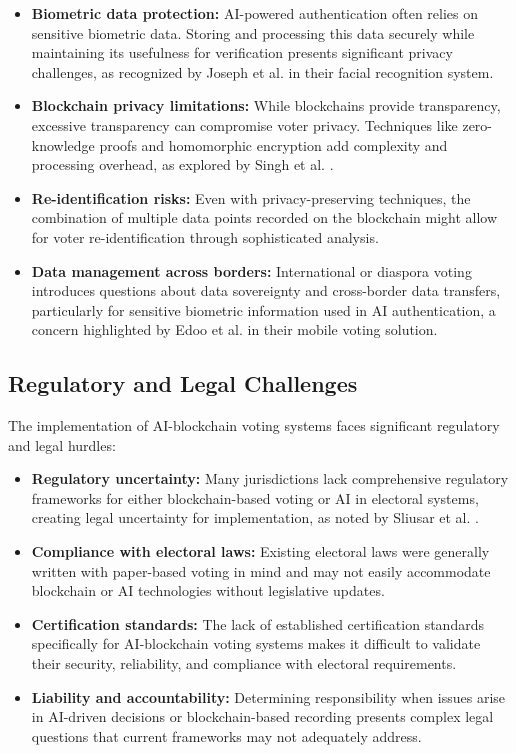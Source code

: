 \documentclass[conference]{IEEEtran}
\begin{document}
\begin{itemize}
    \item \textbf{Biometric data protection:} AI-powered authentication often relies on sensitive biometric data. Storing and processing this data securely while maintaining its usefulness for verification presents significant privacy challenges, as recognized by Joseph et al. \cite{b8} in their facial recognition system.
    
    \item \textbf{Blockchain privacy limitations:} While blockchains provide transparency, excessive transparency can compromise voter privacy. Techniques like zero-knowledge proofs and homomorphic encryption add complexity and processing overhead, as explored by Singh et al. \cite{b7}.
    
    \item \textbf{Re-identification risks:} Even with privacy-preserving techniques, the combination of multiple data points recorded on the blockchain might allow for voter re-identification through sophisticated analysis.
    
    \item \textbf{Data management across borders:} International or diaspora voting introduces questions about data sovereignty and cross-border data transfers, particularly for sensitive biometric information used in AI authentication, a concern highlighted by Edoo et al. \cite{b9} in their mobile voting solution.
\end{itemize}

\subsection{Regulatory and Legal Challenges}
The implementation of AI-blockchain voting systems faces significant regulatory and legal hurdles:

\begin{itemize}
    \item \textbf{Regulatory uncertainty:} Many jurisdictions lack comprehensive regulatory frameworks for either blockchain-based voting or AI in electoral systems, creating legal uncertainty for implementation, as noted by Sliusar et al. \cite{b6}.
    
    \item \textbf{Compliance with electoral laws:} Existing electoral laws were generally written with paper-based voting in mind and may not easily accommodate blockchain or AI technologies without legislative updates.
    
    \item \textbf{Certification standards:} The lack of established certification standards specifically for AI-blockchain voting systems makes it difficult to validate their security, reliability, and compliance with electoral requirements.
    
    \item \textbf{Liability and accountability:} Determining responsibility when issues arise in AI-driven decisions or blockchain-based recording presents complex legal questions that current frameworks may not adequately address.
\end{itemize}
\end{document}
